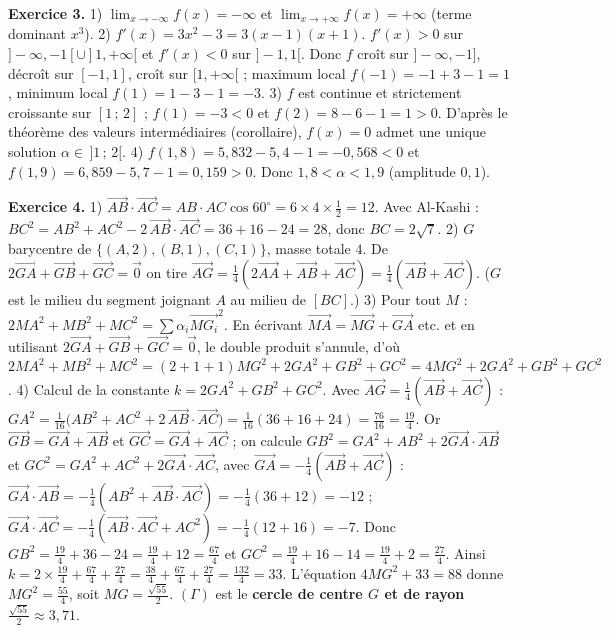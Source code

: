 \noindent\textbf{Exercice 3.}
1) $\lim_{x\to-\infty}f(x)=-\infty$ et $\lim_{x\to+\infty}f(x)=+\infty$ (terme
dominant $x^3$).
2) $f'(x)=3x^2-3=3(x-1)(x+1)$. $f'(x)>0$ sur $]-\infty,-1[\cup]1,+\infty[$ et
$f'(x)<0$ sur $]-1,1[$. Donc $f$ croît sur $]-\infty,-1]$, décroît sur $[-1,1]$,
croît sur $[1,+\infty[$ ; maximum local $f(-1)=-1+3-1=1$, minimum local
$f(1)=1-3-1=-3$.
3) $f$ est continue et strictement croissante sur $[1\,;\,2]$ ;
$f(1)=-3<0$ et $f(2)=8-6-1=1>0$. D'après le théorème des valeurs intermédiaires
(corollaire), $f(x)=0$ admet une unique solution $\alpha\in\,]1\,;\,2[$.
4) $f(1{,}8)=5{,}832-5{,}4-1=-0{,}568<0$ et $f(1{,}9)=6{,}859-5{,}7-1=0{,}159>0$.
Donc $\boxed{1{,}8<\alpha<1{,}9}$ (amplitude $0{,}1$).

\noindent\textbf{Exercice 4.}
1) $\overrightarrow{AB}\cdot\overrightarrow{AC}=AB\cdot AC\cos60^\circ=6\times4\times
\frac12=12$. Avec Al-Kashi : $BC^2=AB^2+AC^2-2\,\overrightarrow{AB}\cdot
\overrightarrow{AC}=36+16-24=28$, donc $BC=2\sqrt7$.
2) $G$ barycentre de $\{(A,2),(B,1),(C,1)\}$, masse totale $4$. De
$2\overrightarrow{GA}+\overrightarrow{GB}+\overrightarrow{GC}=\vec0$ on tire
$\overrightarrow{AG}=\frac14(2\overrightarrow{AA}+\overrightarrow{AB}+
\overrightarrow{AC})=\frac14(\overrightarrow{AB}+\overrightarrow{AC})$. ($G$ est le
milieu du segment joignant $A$ au milieu de $[BC]$.)
3) Pour tout $M$ : $2MA^2+MB^2+MC^2=\sum\alpha_i\overrightarrow{MG_i}^2$. En écrivant
$\overrightarrow{MA}=\overrightarrow{MG}+\overrightarrow{GA}$ etc. et en utilisant
$2\overrightarrow{GA}+\overrightarrow{GB}+\overrightarrow{GC}=\vec0$, le double
produit s'annule, d'où
$2MA^2+MB^2+MC^2=(2+1+1)MG^2+2GA^2+GB^2+GC^2=4MG^2+2GA^2+GB^2+GC^2$.
4) Calcul de la constante $k=2GA^2+GB^2+GC^2$. Avec
$\overrightarrow{AG}=\frac14(\overrightarrow{AB}+\overrightarrow{AC})$ :
$GA^2=\frac1{16}\big(AB^2+AC^2+2\,\overrightarrow{AB}\cdot\overrightarrow{AC}\big)
=\frac1{16}(36+16+24)=\frac{76}{16}=\frac{19}{4}$.
Or $\overrightarrow{GB}=\overrightarrow{GA}+\overrightarrow{AB}$ et
$\overrightarrow{GC}=\overrightarrow{GA}+\overrightarrow{AC}$ ; on calcule
$GB^2=GA^2+AB^2+2\overrightarrow{GA}\cdot\overrightarrow{AB}$ et
$GC^2=GA^2+AC^2+2\overrightarrow{GA}\cdot\overrightarrow{AC}$, avec
$\overrightarrow{GA}=-\frac14(\overrightarrow{AB}+\overrightarrow{AC})$ :
$\overrightarrow{GA}\cdot\overrightarrow{AB}=-\frac14(AB^2+\overrightarrow{AB}\cdot
\overrightarrow{AC})=-\frac14(36+12)=-12$ ;
$\overrightarrow{GA}\cdot\overrightarrow{AC}=-\frac14(\overrightarrow{AB}\cdot
\overrightarrow{AC}+AC^2)=-\frac14(12+16)=-7$.
Donc $GB^2=\frac{19}4+36-24=\frac{19}4+12=\frac{67}4$ et
$GC^2=\frac{19}4+16-14=\frac{19}4+2=\frac{27}4$.
Ainsi $k=2\times\frac{19}4+\frac{67}4+\frac{27}4=\frac{38}4+\frac{67}4+\frac{27}4
=\frac{132}{4}=33$.
L'équation $4MG^2+33=88$ donne $MG^2=\frac{55}{4}$, soit $MG=\frac{\sqrt{55}}2$.
$(\Gamma)$ est le \textbf{cercle de centre $G$ et de rayon $\frac{\sqrt{55}}2\approx
3{,}71$}.

